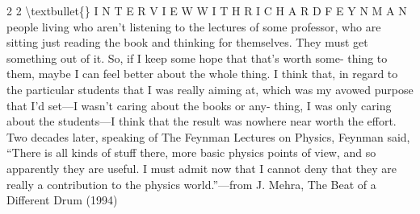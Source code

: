 \documentclass[10pt,oneside]{article}
\begin{document}
2 2 \textbackslash{}textbullet\{\} I N T E R V I E W  W I T H  R I C H A R D  F E Y N M A N people living who aren’t listening to the lectures of some professor, who are sitting just reading the book and thinking for themselves. They must get something out of it. So, if I keep some hope that that’s worth some- thing to them, maybe I can feel better about the whole thing. I think that, in regard to the particular students that I was really aiming at, which was my avowed purpose that I’d set---I wasn’t caring about the books or any- thing, I was only caring about the students---I think that the result was nowhere near worth the effort.\emph{ } Two decades later, speaking of The Feynman Lectures on Physics, Feynman said, “There is all kinds of stuff there, more basic physics points of view, and so apparently they are useful. I must admit now that I cannot deny that they are really a contribution to the physics world.”---from J. Mehra, The Beat of a Different Drum (1994)\par

\clearpage
{}
\end{document}
